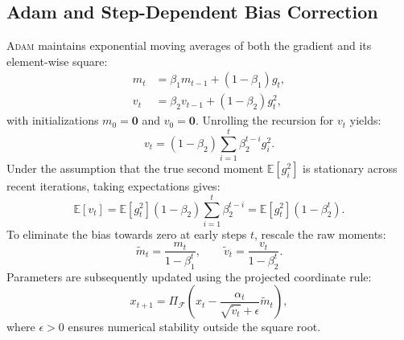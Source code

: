 \subsection{Adam and Step-Dependent Bias Correction}
\textsc{Adam} \citep{kingma2014adam} maintains exponential moving averages of both the gradient and its element-wise square:
\begin{align}
    m_t &= \beta_1 m_{t-1} + (1 - \beta_1) g_t, \label{eq:m_t} \\
    v_t &= \beta_2 v_{t-1} + (1 - \beta_2) g_t^2, \label{eq:v_t}
\end{align}
with initializations $m_0 = \mathbf{0}$ and $v_0 = \mathbf{0}$. Unrolling the recursion for $v_t$ yields:
\begin{equation}
    v_t = (1 - \beta_2) \sum_{i=1}^t \beta_2^{t-i} g_i^2.
\end{equation}
Under the assumption that the true second moment $\mathbb{E}[g_i^2]$ is stationary across recent iterations, taking expectations gives:
\begin{equation}
    \mathbb{E}[v_t] = \mathbb{E}[g_t^2] (1 - \beta_2) \sum_{i=1}^t \beta_2^{t-i} = \mathbb{E}[g_t^2] (1 - \beta_2^t).
\end{equation}
To eliminate the bias towards zero at early steps $t$, \citet{kingma2014adam} rescale the raw moments:
\begin{equation}
    \tilde{m}_t = \frac{m_t}{1 - \beta_1^t}, \qquad \tilde{v}_t = \frac{v_t}{1 - \beta_2^t}.
\end{equation}
Parameters are subsequently updated using the projected coordinate rule:
\begin{equation}
    x_{t+1} = \Pi_{\mathcal{F}}\left( x_t - \frac{\alpha_t}{\sqrt{\tilde{v}_t} + \epsilon} \tilde{m}_t \right),
    \label{eq:adam_update}
\end{equation}
where $\epsilon > 0$ ensures numerical stability outside the square root.

